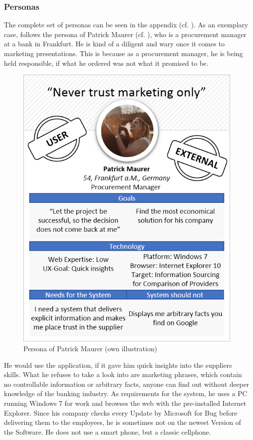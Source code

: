 \subsubsection{Personas}
The complete set of personas can be seen in the appendix (cf. ). As an exemplary case, follows the persona of Patrick Maurer (cf. ), who is a procurement manager at a bank in Frankfurt. He is kind of a diligent and wary once it comes to marketing presentations. This is because as a procurement manager, he is being held responsible, if what he ordered was not what it promised to be. 

\begin{figure}[H]
    \centering
    \includegraphics[height=.5\textheight]{img/diagrams/personas/customer1.png}
    \caption[Persona of Patrick Maurer]{Persona of Patrick Maurer (own illustration)}
    \label{fig:PatrickMaurer}
\end{figure}

He would use the application, if it gave him quick insights into the suppliers skills. What he refuses to take a look into are marketing phrases, which contain no controllable information or arbitrary facts, anyone can find out without deeper knowledge of the banking industry. As requirements for the system, he uses a PC running Windows 7 for work and browses the web with the pre-installed Internet Explorer. Since his company checks every Update by Microsoft for Bug before delivering them to the employees, he is sometimes not on the newest Version of the Software. He does not use a smart phone, but a classic cellphone.

